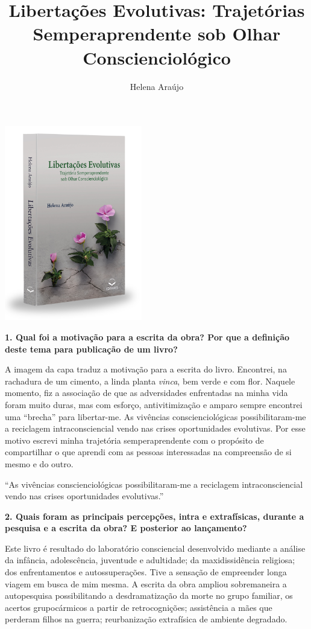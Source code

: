 \documentclass{gescons}
\author{Helena Araújo}
\title{Libertações Evolutivas: Trajetórias Semperaprendente sob Olhar Conscienciológico}
\begin{document}
    \makeentrevistatitle

    \begin{multicols}{2}

\begin{center}
    \includegraphics[width=6cm]{articles/entrevista/mockups/Helena_Araujo.png}
\end{center}


\textbf{1. Qual foi a motivação para a escrita da obra? Por que a definição deste tema para publicação de um livro?}

A imagem da capa traduz a motivação para a escrita do livro. Encontrei, na rachadura de um cimento, a linda planta \emph{vinca}, bem verde e com flor. Naquele momento, fiz a associação de que as adversidades enfrentadas na minha vida foram muito duras, mas com esforço, antivitimização e amparo sempre encontrei uma ``brecha'' para libertar-me. As vivências conscienciológicas possibilitaram-me a reciclagem intraconsciencial vendo nas crises oportunidades evolutivas. Por esse motivo escrevi minha trajetória semperaprendente com o propósito de compartilhar o que aprendi com as pessoas interessadas na compreensão de si mesmo e do outro.

\begin{pullquote}
``As vivências conscienciológicas possibilitaram-me a reciclagem intraconsciencial vendo nas crises oportunidades evolutivas.''
\end{pullquote}

\textbf{2. Quais foram as principais percepções, intra e extrafísicas, durante a pesquisa e a escrita da obra? E posterior ao lançamento?}

Este livro é resultado do laboratório consciencial desenvolvido mediante a análise da infância, adolescência, juventude e adultidade; da maxidissidência religiosa; dos enfrentamentos e autossuperações. Tive a sensação de empreender longa viagem em busca de mim mesma. A escrita da obra ampliou sobremaneira a autopesquisa possibilitando a desdramatização da morte no grupo familiar, os acertos grupocármicos a partir de retrocognições; assistência a mães que perderam filhos na guerra; reurbanização extrafísica de ambiente degradado.



\end{multicols}
\end{document}
